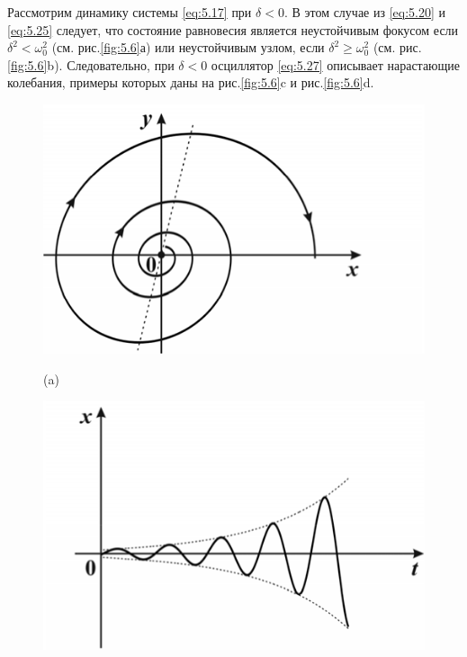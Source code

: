 Рассмотрим динамику системы \eqref{eq:5.17} при $\delta<0$. В этом случае из \eqref{eq:5.20} и \eqref{eq:5.25} следует, что состояние равновесия является неустойчивым фокусом если $\delta^2<\omega_0^2$ (см. рис.\ref{fig:5.6}а) или неустойчивым узлом, если $\delta^2 \geq \omega_0^2$ (см. рис.\ref{fig:5.6}b). Следовательно, при $\delta<0$ осциллятор \eqref{eq:5.27} описывает нарастающие колебания,
примеры которых даны на рис.\ref{fig:5.6}c и рис.\ref{fig:5.6}d. 
\begin{figure}[h]
        \centering
        \begin{minipage}{0.45\linewidth}
                \centering  
                \includegraphics[]{fig/lect5/6a}

                (a)
        \end{minipage}
        \hfill
        \begin{minipage}{0.45\linewidth}
                \centering  
                \includegraphics[]{fig/lect5/6b}


\end{minipage}
\end{figure}
